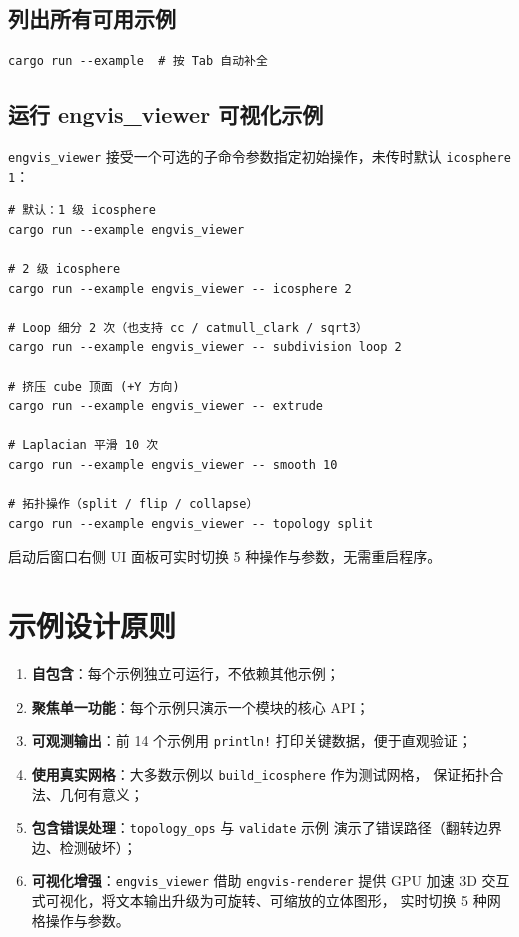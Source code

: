 \documentclass[11pt,a4paper]{article}
\begin{document}
\subsection{列出所有可用示例}

\begin{lstlisting}
cargo run --example  # 按 Tab 自动补全
\end{lstlisting}

\subsection{运行 engvis\_viewer 可视化示例}

\texttt{engvis\_viewer} 接受一个可选的子命令参数指定初始操作，未传时默认 \texttt{icosphere 1}：

\begin{lstlisting}
# 默认：1 级 icosphere
cargo run --example engvis_viewer

# 2 级 icosphere
cargo run --example engvis_viewer -- icosphere 2

# Loop 细分 2 次（也支持 cc / catmull_clark / sqrt3）
cargo run --example engvis_viewer -- subdivision loop 2

# 挤压 cube 顶面 (+Y 方向)
cargo run --example engvis_viewer -- extrude

# Laplacian 平滑 10 次
cargo run --example engvis_viewer -- smooth 10

# 拓扑操作（split / flip / collapse）
cargo run --example engvis_viewer -- topology split
\end{lstlisting}

启动后窗口右侧 UI 面板可实时切换 5 种操作与参数，无需重启程序。

\section{示例设计原则}

\begin{enumerate}
  \item \textbf{自包含}：每个示例独立可运行，不依赖其他示例；
  \item \textbf{聚焦单一功能}：每个示例只演示一个模块的核心 API；
  \item \textbf{可观测输出}：前 14 个示例用 \texttt{println!} 打印关键数据，便于直观验证；
  \item \textbf{使用真实网格}：大多数示例以 \texttt{build\_icosphere} 作为测试网格，
        保证拓扑合法、几何有意义；
  \item \textbf{包含错误处理}：\texttt{topology\_ops} 与 \texttt{validate} 示例
        演示了错误路径（翻转边界边、检测破坏）；
  \item \textbf{可视化增强}：\texttt{engvis\_viewer} 借助 \texttt{engvis-renderer}
        提供 GPU 加速 3D 交互式可视化，将文本输出升级为可旋转、可缩放的立体图形，
        实时切换 5 种网格操作与参数。
\end{enumerate}
\end{document}
